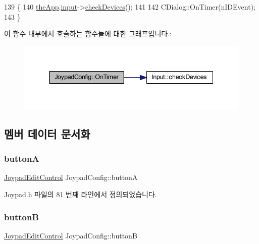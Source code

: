 \begin{DoxyCode}
139 \{
140   \mbox{\hyperlink{_v_b_a_8cpp_a8095a9d06b37a7efe3723f3218ad8fb3}{theApp}}.\mbox{\hyperlink{class_v_b_a_aaab971cb5d67a69e1a26502d15a4dc60}{input}}->\mbox{\hyperlink{class_input_a7a6ef57ff2638f545380618b2d3fdf9d}{checkDevices}}();
141   
142   CDialog::OnTimer(nIDEvent);
143 \}
\end{DoxyCode}
이 함수 내부에서 호출하는 함수들에 대한 그래프입니다.\+:
\nopagebreak
\begin{figure}[H]
\begin{center}
\leavevmode
\includegraphics[width=337pt]{class_joypad_config_af55cd03e7ed293d17d338858285a8087_cgraph}
\end{center}
\end{figure}


\subsection{멤버 데이터 문서화}
\mbox{\label{class_joypad_config_a8b18405a6d92fbdca34cb1d1a6fcee2c}} 
\subsubsection{\texorpdfstring{buttonA}{buttonA}}
{\footnotesize\ttfamily \mbox{\hyperlink{class_joypad_edit_control}{Joypad\+Edit\+Control}} Joypad\+Config\+::buttonA}



Joypad.\+h 파일의 81 번째 라인에서 정의되었습니다.

\mbox{\label{class_joypad_config_a8600f90f1074cda2ff14b73e6fc8e3d6}} 
\subsubsection{\texorpdfstring{buttonB}{buttonB}}
{\footnotesize\ttfamily \mbox{\hyperlink{class_joypad_edit_control}{Joypad\+Edit\+Control}} Joypad\+Config\+::buttonB}



